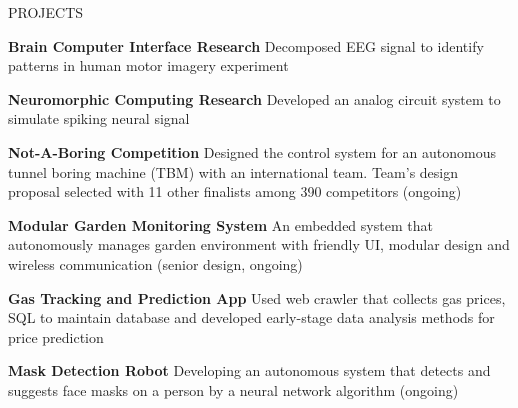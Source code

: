 \documentclass{../lib/resume} %
\begin{document}

\begin{rSection}{PROJECTS}
    \vspace{-1em}
    \item \textbf{Brain Computer Interface Research} {Decomposed EEG signal to identify patterns in human motor imagery experiment}

    \item \textbf{Neuromorphic Computing Research} {Developed an analog circuit system to simulate spiking neural signal}

    \item \textbf{Not-A-Boring Competition} {Designed the control system for an autonomous tunnel boring machine (TBM) with an international team. Team's design proposal selected with 11 other finalists among 390 competitors (ongoing)}

    \item \textbf{Modular Garden Monitoring System} {An embedded system that autonomously manages garden environment with friendly UI, modular design and wireless communication (senior design, ongoing)}

    \item \textbf{Gas Tracking and Prediction App} {Used web crawler that collects gas prices, SQL to maintain database and developed early-stage data analysis methods for price prediction}

    \item \textbf{Mask Detection Robot} {Developing an autonomous system that detects and suggests face masks on a person by a neural network algorithm (ongoing)}


\end{rSection}
\end{document}
